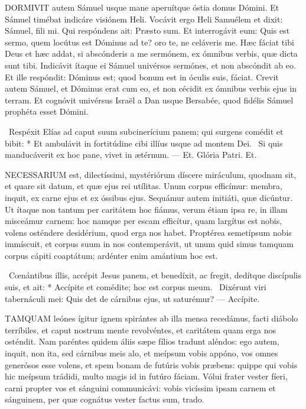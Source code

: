 \lettrine[lines=2]{D}{ORMIVIT} autem Sámuel usque mane aperuítque óstia domus Dómini. Et Sámuel timébat indicáre visiónem Heli. Vocávit ergo Heli Samuélem et dixit: Sámuel, fili mi. Qui respóndens ait: Præsto sum. Et interrogávit eum: Quis est sermo, quem locútus est Dóminus ad te? oro te, ne celáveris me. Hæc fáciat tibi Deus et hæc addat, si abscónderis a me sermónem, ex ómnibus verbis, quæ dicta sunt tibi. Indicávit ítaque ei Sámuel univérsos sermónes, et non abscóndit ab eo. Et ille respóndit: Dóminus est; quod bonum est in óculis suis, fáciat. Crevit autem Sámuel, et Dóminus erat cum eo, et non cécidit ex ómnibus verbis ejus in terram. Et cognóvit univérsus Israël a Dan usque Bersabée, quod fidélis Sámuel prophéta esset Dómini.

\R\ Respéxit Elías ad caput suum subcinerícium panem; qui surgens comédit et bibit: * Et ambulávit in fortitúdine cibi illíus usque ad montem Dei. \V\ Si quis manducáverit ex hoc pane, vivet in ætérnum. --- Et. Glória Patri. Et.





\lettrine[lines=2]{N}{ECESSARIUM} est, dilectíssimi, mystériórum díscere miráculum, quodnam sit, et quare sit datum, et quæ ejus rei utílitas. Unum corpus efficímur: membra, inquit, ex carne ejus et ex óssibus ejus. Sequámur autem initiáti, quæ dicúntur. Ut ítaque non tantum per caritátem hoc fiámus, verum étiam ipsa re, in illam misceámur carnem: hoc namque per escam efficítur, quam largítus est nobis, volens osténdere desidérium, quod erga nos habet. Proptérea semetípsum nobis immíscuit, et corpus suum in nos contemperávit, ut unum quid simus tamquam corpus cápiti coaptátum; ardénter enim amántium hoc est.

\R\ Cœnántibus illis, accépit Jesus panem, et benedíxit, ac fregit, dedítque discípulis suis, et ait: * Accípite et comédite; hoc est corpus meum. \V\ Dixérunt viri tabernáculi mei: Quis det de cárnibus ejus, ut saturémur? --- Accípite.


\lettrine[lines=2]{T}{AMQUAM} leónes ígitur ignem spirántes ab illa mensa recedámus, facti diábolo terríbiles, et caput nostrum mente revolvéntes, et caritátem quam erga nos osténdit. Nam paréntes quidem áliis sæpe fílios tradunt aléndos: ego autem, inquit, non ita, sed cárnibus meis alo, et meípsum vobis appóno, vos omnes generósos esse volens, et spem bonam de futúris vobis præbens: quippe qui vobis hic meípsum trádidi, multo magis id in futúro fáciam. Vólui frater vester fíeri, carni propter vos et sánguini communicávi: vobis vicíssim ipsam carnem et sánguinem, per quæ cognátus vester factus sum, trado.

